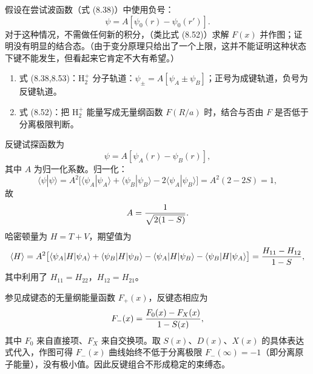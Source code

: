 \begin{question}
假设在尝试波函数（式 (8.38)）中使用负号：
\[
\psi=A[\psi_0(r)-\psi_0(r')].
\]
对于这种情况，不需做任何新的积分，（类比式 (8.52)）求解 $F(x)$ 并作图；证明没有明显的结合态。（由于变分原理只给出了一个上限，这并不能证明这种状态下键不能发生，但看起来它肯定不大有希望。）

\par\smallskip
{}
\begin{enumerate}[leftmargin=2.2em,itemsep=0.12em,topsep=0.12em,parsep=0pt]
\item 式 (8.38,8.53)：$\mathrm H_2^+$ 分子轨道：$\psi_\pm=A[\psi_A\pm\psi_B]$；正号为成键轨道，负号为反键轨道。
\item 式 (8.52)：把 $\mathrm H_2^+$ 能量写成无量纲函数 $F(R/a)$ 时，结合与否由 $F$ 是否低于分离极限判断。
\end{enumerate}

\end{question}
\begin{solution}
反键试探函数为
\[
\psi=A[\psi_A(r)-\psi_B(r)],
\]
其中 $A$ 为归一化系数。归一化：
\[
\langle\psi|\psi\rangle=A^2\bigl[\langle\psi_A|\psi_A\rangle+\langle\psi_B|\psi_B\rangle-2\langle\psi_A|\psi_B\rangle\bigr]
=A^2(2-2S)=1,
\]
故
\[
A={1\over\sqrt{2(1-S)}}.
\]
哈密顿量为 $H=T+V$，期望值为
\[
\langle H\rangle=
{A^2}\bigl[\langle\psi_A|H|\psi_A\rangle+\langle\psi_B|H|\psi_B\rangle
-\langle\psi_A|H|\psi_B\rangle-\langle\psi_B|H|\psi_A\rangle\bigr]
={H_{11}-H_{12}\over1-S},
\]
其中利用了 $H_{11}=H_{22}$，$H_{12}=H_{21}$。

参见成键态的无量纲能量函数 $F_+(x)$，反键态相应为
\[
F_-(x)={F_0(x)-F_X(x)\over1-S(x)},
\]
其中 $F_0$ 来自直接项、$F_X$ 来自交换项。取 $S(x)$、$D(x)$、$X(x)$ 的具体表达式代入，作图可得 $F_-(x)$ 曲线始终不低于分离极限 $F_-(\infty)=-1$（即分离原子能量），没有极小值。因此反键组合不形成稳定的束缚态。
\end{solution}

